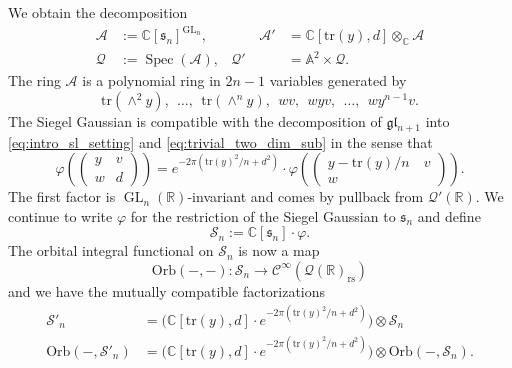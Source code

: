 \documentclass[reqno, 11pt]{amsart} %
\numberwithin{equation}{section}
\theoremstyle{plain}
\theoremstyle{definition}
\theoremstyle{remark}
\newcommand{\mr}{\mathrm}
\newcommand{\tr}{\mathrm{tr}}
\newcommand{\tensor}{\otimes}
\newcommand{\lr}{\longrightarrow}
\newcommand{\mbA}{\mathbb{A}}
\newcommand{\mbC}{\mathbb{C}}
\newcommand{\mbR}{\mathbb{R}}
\newcommand{\mcA}{\mathcal{A}}
\newcommand{\mcC}{\mathcal{C}}
\newcommand{\mcQ}{\mathcal{Q}}
\newcommand{\mcS}{\mathcal{S}}
\newcommand{\mfg}{\mathfrak{g}}
\newcommand{\mfl}{\mathfrak{l}}
\newcommand{\rs}{\mr{rs}}
\newcommand{\mfgl}{\mfg\mfl}
\newcommand{\bbC}{\mathbb C}
\newcommand{\lie}[1]{ \mathfrak{#1}}
\DeclareMathOperator{\Spec}{Spec}
\DeclareMathOperator{\GL}{GL}
\newcommand{\Orb}{\mathrm{Orb}}
\begin{document}
We obtain the decomposition
\begin{equation*}
\begin{aligned}
\mcA & := \mbC[\lie s_n]^{\GL_n}, & \qquad \mcA' &= \mbC[\tr(y), d] \tensor_{\bbC} \mcA\\[1mm]
\mcQ & := \Spec(\mcA),&  \mcQ' &= \mbA^2 \times \mcQ.
\end{aligned}
\end{equation*}
The ring $\mcA$ is a polynomial ring in $2n-1$ variables generated by
\begin{equation}\label{eq:invariant_functions_SL}
\tr(\wedge^2 y),\ \ \ldots,\ \ \tr(\wedge^n y),\ \ wv,\ \ wyv,\ \ \ldots,\ \ wy^{n-1}v.
\end{equation}
The Siegel Gaussian is compatible with the decomposition of $\mfgl_{n+1}$ into \eqref{eq:intro_sl_setting} and \eqref{eq:trivial_two_dim_sub} in the sense that
$$
φ\left(\begin{pmatrix} y & v \\ w & d\end{pmatrix}\right) = e^{-2π(\tr(y)^2/n + d^2)}\cdot φ\left(\begin{pmatrix} y - \tr(y)/n & \ v \\ w & \end{pmatrix}\right).
$$
The first factor is $\GL_n(\mbR)$-invariant and comes by pullback from $\mcQ'(\mbR)$. We continue to write $φ$ for the restriction of the Siegel Gaussian to $\lie s_n$ and define
\begin{equation}\label{eq:def_S_n}
\mcS_n := \mbC[\lie s_n]\cdot φ.
\end{equation}
The orbital integral functional on $\mcS_n$ is now a map
$$\Orb(-,-)\colon \mcS_n \lr \mcC^\infty(\mcQ(\mbR)_\rs)$$
and we have the mutually compatible factorizations
\begin{equation}\label{eq:S_n_different_notation}
\begin{aligned}
\mcS'_n & = \big(\mbC[\tr(y), d]\cdot e^{-2π(\tr(y)^2/n+ d^2)}\big) \tensor \mcS_n\\
\Orb(-,\mcS'_n) & = \big(\mbC[\tr(y), d]\cdot e^{-2π(\tr(y)^2/n + d^2)}\big) \tensor \Orb(-,\mcS_n).
\end{aligned}
\end{equation}
\end{document}
